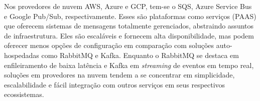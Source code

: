 Nos provedores de nuvem AWS, Azure e GCP, tem-se o SQS, Azure Service Bus e Google Pub/Sub, respectivamente. Esses são plataformas como serviços (PAAS) que oferecem sistemas de mensagens totalmente gerenciados, abstraindo assuntos de infraestrutura. Eles são escaláveis e fornecem alta disponibilidade, mas podem oferecer menos opções de configuração em comparação com soluções auto-hospedadas como RabbitMQ e Kafka. Enquanto o RabbitMQ se destaca em enfileiramento de baixa latência e Kafka em \emph{streaming} de eventos em tempo real, soluções em provedores na nuvem tendem a se concentrar em simplicidade, escalabilidade e fácil integração com outros serviços em seus respectivos ecossistemas.











